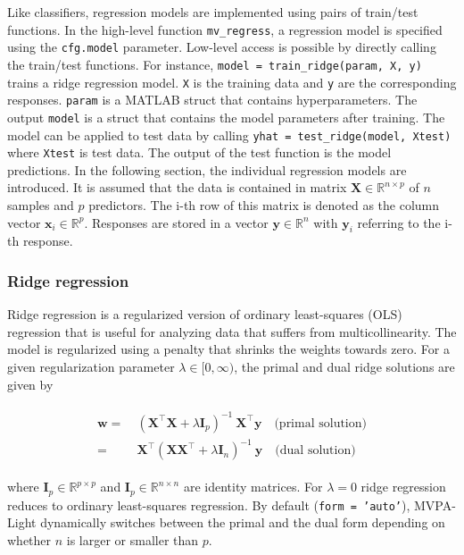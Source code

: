 \documentclass[utf8]{frontiersSCNS} %
\newcommand{\w}{\mathbf{w}}
\newcommand{\x}{\mathbf{x}}
\newcommand{\y}{\mathbf{y}}
\newcommand{\I}{\mathbf{I}}
\newcommand{\R}{\mathbb{R}}
\newcommand{\X}{\mathbf{X}}
\newcommand{\ttt}[1]{\texttt{#1}}
\begin{document}
Like classifiers, regression models are implemented using pairs of train/test functions. In the high-level function \ttt{mv\_regress}, a regression model is specified using the \ttt{cfg.model} parameter. Low-level access is possible by directly calling the train/test functions. For instance, \ttt{model = train\_ridge(param, X, y)} trains a ridge regression model. \ttt{X} is the training data and \ttt{y} are the corresponding responses. \ttt{param} is a MATLAB struct that contains hyperparameters. The output \ttt{model} is a struct that contains the model parameters after training. The model can be applied to test data by calling \ttt{yhat = test\_ridge(model, Xtest)} where \ttt{Xtest} is test data. The output of the test function is the model predictions. In the following section, the individual regression models are introduced. It is assumed that the data is contained in matrix $\X\in\R^{n \times p}$ of $n$ samples and $p$ predictors. The i-th row of this matrix is denoted as the column vector $\x_i\in\R^p$. Responses are stored in a vector $\y\in\R^n$ with $\y_i$ referring to the i-th response.

\subsubsection{Ridge regression}

Ridge regression is a regularized version of ordinary least-squares (OLS) regression that is useful for analyzing data that suffers from multicollinearity. The model is regularized using a penalty that shrinks the weights towards zero. For a given regularization parameter $\lambda\in[0,\infty)$, the primal and dual ridge solutions are given by


\begin{align}
\begin{split}
\label{eq:ridge}
\w =\ & (\X^\top\X + \lambda\I_p)^{-1}\ \X^\top\y \quad\text{(primal solution)}\\
 =\ & \X^\top (\X\X^\top + \lambda\I_n)^{-1}\ \y \quad\text{(dual solution)}
\end{split}
\end{align}

where $\I_p\in\R^{p\times p}$ and $\I_p\in\R^{n\times n}$ are identity matrices. For $\lambda=0$ ridge regression reduces to ordinary least-squares regression. By default (\ttt{form = 'auto'}), MVPA-Light dynamically switches between the primal and the dual form depending on whether $n$ is larger or smaller than $p$.
\end{document}
